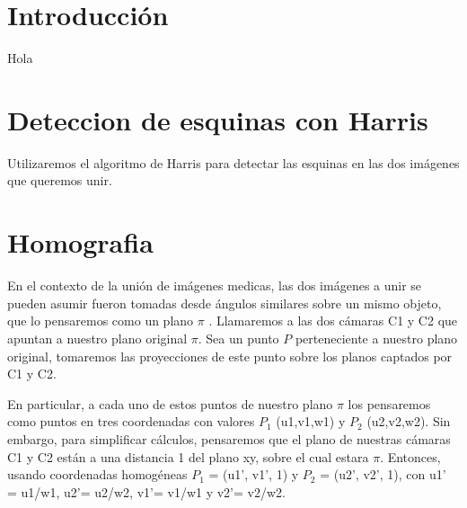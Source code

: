 \documentclass{article}
\begin{document}

\newcommand{\dato}{\textit{Dato}}
\newcommand{\individuo}{\textit{Individuo}}


\maketitle

\section{Introducción}
\par Hola
\section{Deteccion de esquinas con Harris}
Utilizaremos el algoritmo de Harris para detectar las esquinas en las dos imágenes que
queremos unir. 
\section{Homografia}
\par En el contexto de la unión de imágenes medicas, las dos imágenes a unir se pueden asumir fueron tomadas desde ángulos
similares sobre un mismo objeto, que lo pensaremos como un plano $\pi$ . Llamaremos a las dos cámaras C1 y C2 que apuntan
a nuestro plano original $\pi$. Sea un punto $P$ perteneciente a nuestro plano original, tomaremos las proyecciones de 
este punto sobre los planos captados por C1 y C2.

\par En particular, a cada uno de estos puntos de nuestro plano $\pi$ los pensaremos como puntos en tres coordenadas 
con valores $P_1$ (u1,v1,w1) y $P_2$ (u2,v2,w2). Sin embargo, para simplificar cálculos, pensaremos que el plano de nuestras 
cámaras C1 y C2 están a una distancia 1 del plano xy, sobre el cual estara $\pi$. Entonces, usando coordenadas
homogéneas $P_1$ = (u1', v1', 1) y $P_2$ = (u2', v2', 1), con u1' = u1/w1, 
u2'= u2/w2, v1'= v1/w1 y v2'= v2/w2.
\end{document}
